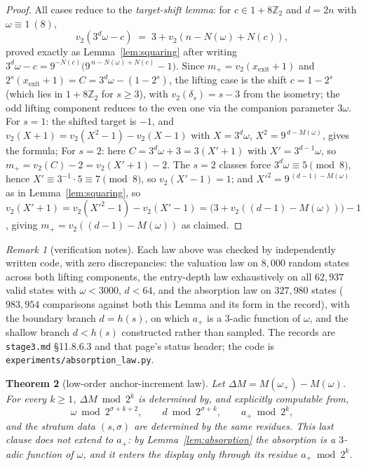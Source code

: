 \documentclass[11pt]{article}
\newtheorem{theorem}{Theorem}[section]
\theoremstyle{remark}
\newtheorem{remark}[theorem]{Remark}
\newcommand{\Z}{\mathbb{Z}}
\newcommand{\vt}[1]{v_2\!\left(#1\right)}
\newcommand{\w}{\omega}
\newcommand{\wnext}{\w_{+}}
\begin{document}
\begin{proof}
All cases reduce to the \emph{target-shift lemma}: for $c \in 1 + 8\Z_2$ and $d = 2n$ with $\w \equiv 1\ (8)$,
\[ \vt{3^{d}\w - c} \;=\; 3 + \vt{n - N(\w) + N(c)}, \]
proved exactly as Lemma~\ref{lem:squaring} after writing $3^d\w - c = 9^{-N(c)}\bigl(9^{\,n - N(\w) + N(c)} - 1\bigr)$. Since $m_+ = \vt{x_{\mathrm{exit}}+1}$ and $2^s(x_{\mathrm{exit}}+1) = C = 3^d\w - (1 - 2^s)$, the lifting case is the shift $c = 1 - 2^s$ (which lies in $1+8\Z_2$ for $s \ge 3$), with $\vt{\delta_s} = s - 3$ from the isometry; the odd lifting component reduces to the even one via the companion parameter $3\w$. For $s = 1$: the shifted target is $-1$, and $\vt{X+1} = \vt{X^2-1} - \vt{X-1}$ with $X = 3^d\w$, $X^2 = 9^{\,d - M(\w)}$, gives the formula; For $s = 2$: here $C = 3^d\w + 3 = 3(X' + 1)$ with $X' = 3^{d-1}\w$, so $m_+ = \vt{C} - 2 = \vt{X'+1} - 2$. The $s=2$ classes force $3^d\w \equiv 5 \pmod 8$, hence $X' \equiv 3^{-1}\cdot 5 \equiv 7 \pmod 8$, so $\vt{X'-1} = 1$; and $X'^2 = 9^{\,(d-1) - M(\w)}$ as in Lemma~\ref{lem:squaring}, so $\vt{X'+1} = \vt{X'^2-1} - \vt{X'-1} = \bigl(3 + \vt{(d-1) - M(\w)}\bigr) - 1$, giving $m_+ = \vt{(d-1) - M(\w)}$ as claimed.
\end{proof}

\begin{remark}[verification notes]\label{rem:verify1}
Each law above was checked by independently written code, with zero discrepancies: the valuation law on $8{,}000$ random states across both lifting components, the entry-depth law exhaustively on all $62{,}937$ valid states with $\w < 3000$, $d < 64$, and the absorption law on $327{,}980$ states ($983{,}954$ comparisons against both this Lemma and its form in the record), with the boundary branch $d = h(s)$, on which $a_+$ is a $3$-adic function of $\w$, and the shallow branch $d < h(s)$ constructed rather than sampled. The records are \texttt{stage3.md} \S11.8.6.3 and that page's status header; the code is \texttt{experiments/absorption\_law.py}.
\end{remark}

\begin{theorem}[low-order anchor-increment law]\label{thm:deltaM}
Let $\Delta M = M(\wnext) - M(\w)$. For every $k \ge 1$, $\Delta M \bmod 2^k$ is determined by, and explicitly computable from,
\[ \w \bmod 2^{\sigma + k + 2},\qquad d \bmod 2^{\sigma + k},\qquad a_+ \bmod 2^k, \]
and the stratum data $(s, \sigma)$ are determined by the same residues. This last clause does not extend to $a_+$: by Lemma~\ref{lem:absorption} the absorption is a $3$-adic function of $\w$, and it enters the display only through its residue $a_+ \bmod 2^k$.
\end{theorem}
\end{document}
